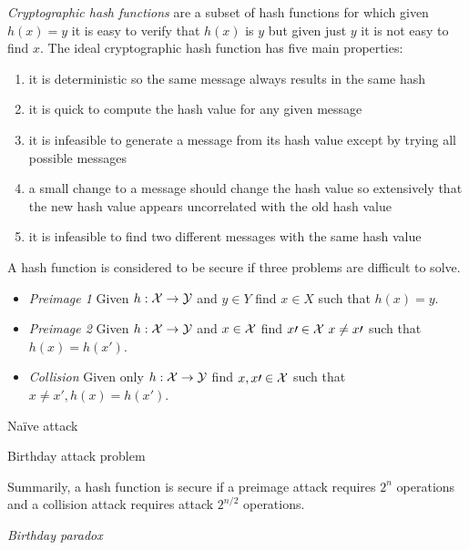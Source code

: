 \textit{Cryptographic hash functions} are a subset of hash functions
for which given $h(x) = y$ it is easy to verify that $h(x)$ is $y$
but given just $y$ it is not easy to find $x$.
The ideal cryptographic hash function has five main properties:
\begin{enumerate}
	\item it is deterministic so the same message always results in the same hash
	\item it is quick to compute the hash value for any given message
	\item it is infeasible to generate a message from its hash value except by trying all possible messages
	\item a small change to a message should change the hash value so extensively that the new hash value appears uncorrelated with the old hash value
	\item it is infeasible to find two different messages with the same hash value
\end{enumerate}
A hash function is considered to be secure if three problems are difficult to solve.
\begin{itemize}
	\item \textit{Preimage 1}
		Given $h : \mathcal{X} \rightarrow \mathcal{Y}$
		and $y \in Y$
		find $x \in X$
		such that $h(x) = y$.
	\item \textit{Preimage 2}
		Given $h : \mathcal{X} \rightarrow \mathcal{Y}$
		and $x \in \mathcal{X}$
		find $x\prime \in \mathcal{X}\ x \neq x\prime$
		such that $h(x) = h(x\prime)$.
	\item \textit{Collision}
		Given only $h : \mathcal{X} \rightarrow \mathcal{Y}$
		find $x, x\prime \in \mathcal{X}$
		such that $x \neq x\prime, h(x) = h(x\prime)$.
\end{itemize}

Na\"ive attack

Birthday attack problem

Summarily, a hash function is secure if
a preimage attack requires $2^n$ operations and
a collision attack requires attack $2^{n/2}$ operations.

\textit{Birthday paradox}

